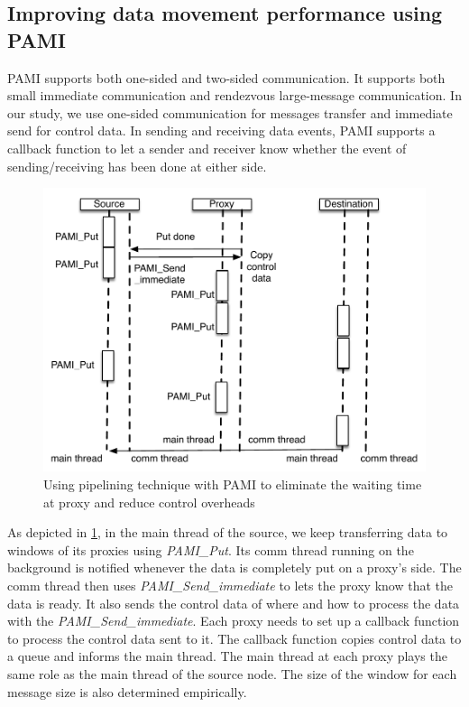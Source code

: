 \documentclass[final,5p,times]{elsarticle}
\begin{document}
\subsection{Improving data movement performance using PAMI}
PAMI supports both one-sided and two-sided communication. It supports both small immediate communication and rendezvous large-message communication. In our study, we use one-sided communication for messages transfer and immediate send for control data. In sending and receiving data events, PAMI supports a callback function to let a sender and receiver know whether the event of sending/receiving has been done at either side.

\begin{figure}[!htb]
\centering
\includegraphics[scale=0.5]{pami_pipeline.pdf}
\caption{Using pipelining technique with PAMI to eliminate the waiting time at proxy and reduce control overheads}
\label{fig:pami_pipeline}
\end{figure}

As depicted in \ref{fig:pami_pipeline}, in the main thread of the source, we keep transferring data to windows of its proxies using \textit{PAMI\_Put}. Its comm thread running on the background is notified whenever the data is completely put on a proxy's side. The comm thread then uses \textit{PAMI\_Send\_immediate} to lets the proxy know that the data is ready. It also sends the control data of where and how to process the data with the \textit{PAMI\_Send\_immediate}. Each proxy needs to set up a callback function to process the control data sent to it. The callback function copies control data to a queue and informs the main thread. The main thread at each proxy plays the same role as the main thread of the source node. The size of the window for each message size is also determined empirically.
\end{document}
